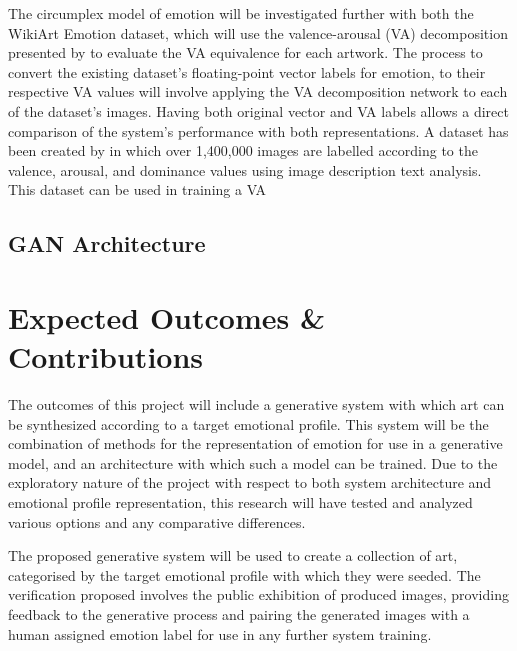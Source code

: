 \documentclass{article}
\begin{document}
The circumplex model of emotion will be investigated further with both the WikiArt Emotion dataset, which will use the valence-arousal (VA) decomposition presented by \citet{kim2018building} to evaluate the VA equivalence for each artwork.
The process to convert the existing dataset's floating-point vector labels for emotion, to their respective VA values will involve applying the VA decomposition network to each of the dataset's images.
Having both original vector and VA labels allows a direct comparison of the system's performance with both representations.
A dataset has been created by \citet{zhao2016predicting} in which over 1,400,000 images are labelled according to the valence, arousal, and dominance values using image description text analysis.
This dataset can be used in training a VA 

\subsection{GAN Architecture}




\section{Expected Outcomes \& Contributions}

The outcomes of this project will include a generative system with which art can be synthesized according to a target emotional profile.
This system will be the combination of methods for the representation of emotion for use in a generative model, and an architecture with which such a model can be trained.
Due to the exploratory nature of the project with respect to both system architecture and emotional profile representation, this research will have tested and analyzed various options and any comparative differences.

The proposed generative system will be used to create a collection of art, categorised by the target emotional profile with which they were seeded.
The verification proposed involves the public exhibition of produced images, providing feedback to the generative process and pairing the generated images with a human assigned emotion label for use in any further system training.




\end{document}
